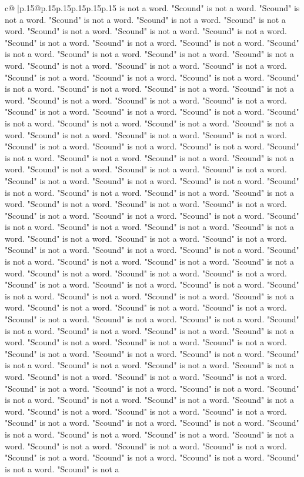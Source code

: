 \documentclass{article}
\begin{document}
{\begin{supertabular}{c@{$\;$}|p{.15\linewidth}@{}p{.15\linewidth}p{.15\linewidth}p{.15\linewidth}p{.15\linewidth}p{.15\linewidth}}
{{{is not a word. "Scound" is not a word. "Scound" is not a word. "Scound" is not a word. "Scound" is not a word. "Scound" is not a word. "Scound" is not a word. "Scound" is not a word. "Scound" is not a word. "Scound" is not a word. "Scound" is not a word. "Scound" is not a word. "Scound" is not a word. "Scound" is not a word. "Scound" is not a word. "Scound" is not a word. "Scound" is not a word. "Scound" is not a word. "Scound" is not a word. "Scound" is not a word. "Scound" is not a word. "Scound" is not a word. "Scound" is not a word. "Scound" is not a word. "Scound" is not a word. "Scound" is not a word. "Scound" is not a word. "Scound" is not a word. "Scound" is not a word. "Scound" is not a word. "Scound" is not a word. "Scound" is not a word. "Scound" is not a word. "Scound" is not a word. "Scound" is not a word. "Scound" is not a word. "Scound" is not a word. "Scound" is not a word. "Scound" is not a word. "Scound" is not a word. "Scound" is not a word. "Scound" is not a word. "Scound" is not a word. "Scound" is not a word. "Scound" is not a word. "Scound" is not a word. "Scound" is not a word. "Scound" is not a word. "Scound" is not a word. "Scound" is not a word. "Scound" is not a word. "Scound" is not a word. "Scound" is not a word. "Scound" is not a word. "Scound" is not a word. "Scound" is not a word. "Scound" is not a word. "Scound" is not a word. "Scound" is not a word. "Scound" is not a word. "Scound" is not a word. "Scound" is not a word. "Scound" is not a word. "Scound" is not a word. "Scound" is not a word. "Scound" is not a word. "Scound" is not a word. "Scound" is not a word. "Scound" is not a word. "Scound" is not a word. "Scound" is not a word. "Scound" is not a word. "Scound" is not a word. "Scound" is not a word. "Scound" is not a word. "Scound" is not a word. "Scound" is not a word. "Scound" is not a word. "Scound" is not a word. "Scound" is not a word. "Scound" is not a word. "Scound" is not a word. "Scound" is not a word. "Scound" is not a word. "Scound" is not a word. "Scound" is not a word. "Scound" is not a word. "Scound" is not a word. "Scound" is not a word. "Scound" is not a word. "Scound" is not a word. "Scound" is not a word. "Scound" is not a word. "Scound" is not a word. "Scound" is not a word. "Scound" is not a word. "Scound" is not a word. "Scound" is not a word. "Scound" is not a word. "Scound" is not a word. "Scound" is not a word. "Scound" is not a word. "Scound" is not a word. "Scound" is not a word. "Scound" is not a word. "Scound" is not a word. "Scound" is not a word. "Scound" is not a word. "Scound" is not a word. "Scound" is not a word. "Scound" is not a word. "Scound" is not a word. "Scound" is not a word. "Scound" is not a word. "Scound" is not a word. "Scound" is not a word. "Scound" is not a word. "Scound" is not a word. "Scound" is not a word. "Scound" is not a word. "Scound" is not a word. "Scound" is not a word. "Scound" is not a word. "Scound" is not a word. "Scound" is not a word. "Scound" is not a word. "Scound" is not a word. "Scound" is not a word. "Scound" is not a word. "Scound" is not a word. "Scound" is not a word. "Scound" is not a word. "Scound" is not a word. "Scound" is not a }}}
\end{supertabular}}
\end{document}
